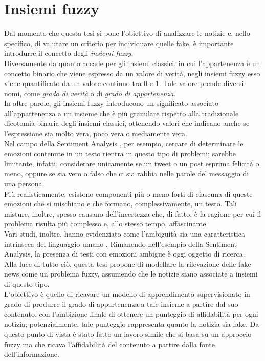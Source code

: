 \documentclass[12pt]{report}
\theoremstyle{definition}
\begin{document}
\section{Insiemi fuzzy} \label{insiemifuzzy}
Dal momento che questa tesi si pone l'obiettivo di analizzare le notizie e, nello specifico, di valutare un criterio per individuare quelle fake, è importante introdurre il concetto degli \textit{insiemi fuzzy}.
\\
Diversamente da quanto accade per gli insiemi classici, in cui l'appartenenza  è un concetto binario che viene espresso da un valore di verità, negli insiemi fuzzy esso viene quantificato da un valore continuo tra 0 e 1.
Tale valore prende diversi nomi, come \textit{grado di verità} o di \textit{grado di appartenenza}.
\\
In altre parole, gli insiemi fuzzy introducono un significato associato all'appartenenza a un insieme che è più granulare rispetto alla tradizionale dicotomia binaria degli insiemi classici, ottenendo valori che indicano anche se l'espressione sia molto vera, poco vera o mediamente vera.
\\
Nel campo della Sentiment Analysis \cite{25}, per esempio, cercare di determinare le emozioni contenute in un testo rientra in questo tipo di problemi; sarebbe limitante, infatti, considerare unicamente se un tweet o un post esprima felicità o meno, oppure se sia vero o falso che ci sia rabbia nelle parole del messaggio di una persona.
\\
Più realisticamente, esistono componenti più o meno forti di ciascuna di queste emozioni che si mischiano e che formano, complessivamente, un testo.
Tali misture, inoltre, spesso causano dell'incertezza che, di fatto, è la ragione per cui il problema risulta più complesso e, allo stesso tempo, affascinante.
\\
Vari studi, inoltre, hanno evidenziato come l'ambiguità sia una caratteristica intrinseca del linguaggio umano \cite{26, 27}.
Rimanendo nell'esempio della Sentiment Analysis, la presenza di testi con emozioni ambigue è oggi oggetto di ricerca.
\\
Alla luce di tutto ciò, questa tesi propone di modellare la rilevazione delle fake news come un problema fuzzy, assumendo che le notizie siano associate a insiemi di questo tipo.
\\
L'obiettivo è quello di ricavare un modello di apprendimento supervisionato in grado di produrre il grado di appartenenza a tale insieme a partire dal suo contenuto, con l'ambizione finale di ottenere un punteggio di affidabilità per ogni notizia;
potenzialmente, tale punteggio rappresenta quanto la notizia sia fake. Da questo punto di vista è stato fatto un lavoro simile \cite{35} che si basa su un approccio fuzzy ma che ricava l'affidabilità del contenuto a partire dalla fonte dell'informazione.
\end{document}
